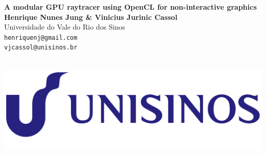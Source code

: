 \documentclass[a0,portrait]{a0poster}
\begin{document}
\begin{minipage}[b]{0.75\linewidth}
  \veryHuge \color{NavyBlue} \textbf{A modular GPU raytracer using
    OpenCL for non-interactive graphics} \color{Black}\\[2cm] %
  \huge \textbf{Henrique Nunes Jung \& Vinicius Jurinic
    Cassol}\\[0.5cm] %
  \huge Universidade do Vale do Rio dos
  Sinos\\[0.4cm] %
  \Large \texttt{henriquenj@gmail.com} \\
  \Large \texttt{vjcassol@unisinos.br} \\
  \
\end{minipage}
%
\begin{minipage}[b]{0.25\linewidth}
\includegraphics[width=20cm]{logo_unisinos.png}\\
\end{minipage}

\vspace{1cm} %

\end{document}
